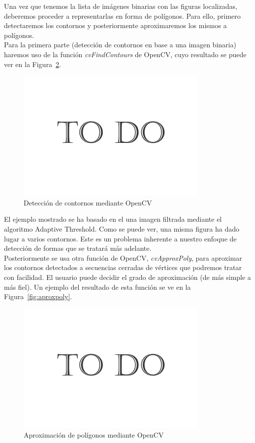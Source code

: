 {	Una vez que tenemos la lista de imágenes binarias con las figuras localizadas, deberemos proceder a representarlas en forma de polígonos. Para ello, primero detectaremos los contornos y posteriormente aproximaremos los mismos a polígonos.\\
	
	Para la primera parte (detección de contornos en base a una imagen binaria) haremos uso de la función \emph{cvFindContours} de OpenCV, cuyo resultado se puede ver en la Figura~\ref{fig:findcontours}.\\
	
		\begin{figure}[htbp]
		\centering
		\hspace*{-0.3in}
		\includegraphics[scale=0.47]{graphics/todo.png}
		\caption{Detección de contornos mediante OpenCV}
		\label{fig:findcontours}
		\end{figure}
		
	El ejemplo mostrado se ha basado en el una imagen filtrada mediante el algoritmo Adaptive Threshold. Como se puede ver, una misma figura ha dado lugar a varios contornos. Este es un problema inherente a nuestro enfoque de detección de formas que se tratará más adelante.\\
	
	Posteriormente se usa otra función de OpenCV, \emph{cvApproxPoly}, para aproximar los contornos detectados a secuencias cerradas de vértices que podremos tratar con facilidad. El usuario puede decidir el grado de aproximación (de más simple a más fiel). Un ejemplo del resultado de esta función se ve en la Figura~\ref{fig:aproxpoly}.\\
	
		\begin{figure}[htbp]
		\centering
		\hspace*{-0.3in}
		\includegraphics[scale=0.47]{graphics/todo.png}
		\caption{Aproximación de polígonos mediante OpenCV}
		\label{fig:findcontours}
		\end{figure}
				
}
